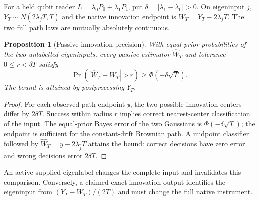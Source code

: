 \documentclass[11pt,oneside,openany]{book}
\newtheorem{proposition}[theorem]{Proposition}
\theoremstyle{definition}
\theoremstyle{remark}\newtheorem{remark}[theorem]{Remark}
\begin{document}
For a held qubit reader $L=\lambda_0P_0+\lambda_1P_1$, put $\delta=|\lambda_1-\lambda_0|>0$. On eigeninput $j$,
$Y_T\sim N(2\lambda_jT,T)$ and the native innovation endpoint is $W_T=Y_T-2\lambda_jT$. The two full path laws are mutually absolutely continuous.

\begin{proposition}[Passive innovation precision]
\label{cpc:prop:precision}
With equal prior probabilities of the two unlabelled eigeninputs, every passive estimator $\widehat W_T$ and tolerance $0\le r<\delta T$ satisfy
\begin{equation}
 \Pr(|\widehat W_T-W_T|>r)\ge\Phi(-\delta\sqrt T).
 \label{cpc:eq:precision}
\end{equation}
The bound is attained by postprocessing $Y_T$.
\end{proposition}
\begin{proof}
For each observed path endpoint $y$, the two possible innovation centers differ by $2\delta T$. Success within radius $r$ implies correct nearest-center classification of the input. The equal-prior Bayes error of the two Gaussians is $\Phi(-\delta\sqrt T)$; the endpoint is sufficient for the constant-drift Brownian path. A midpoint classifier followed by $\widehat W_T=y-2\lambda_{\widehat j}T$ attains the bound: correct decisions have zero error and wrong decisions error $2\delta T$.
\end{proof}

An active supplied eigenlabel changes the complete input and invalidates this comparison. Conversely, a claimed exact innovation output identifies the eigeninput from $(Y_T-W_T)/(2T)$ and must change the full native instrument.
\end{document}

